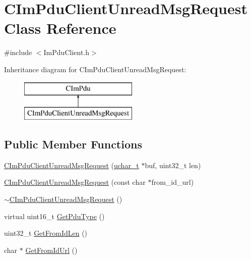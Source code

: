 \hypertarget{class_c_im_pdu_client_unread_msg_request}{}\section{C\+Im\+Pdu\+Client\+Unread\+Msg\+Request Class Reference}
\label{class_c_im_pdu_client_unread_msg_request}


{\ttfamily \#include $<$Im\+Pdu\+Client.\+h$>$}

Inheritance diagram for C\+Im\+Pdu\+Client\+Unread\+Msg\+Request\+:\begin{figure}[H]
\begin{center}
\leavevmode
\includegraphics[height=2.000000cm]{class_c_im_pdu_client_unread_msg_request}
\end{center}
\end{figure}
\subsection*{Public Member Functions}
\begin{DoxyCompactItemize}
\item 
\hyperlink{class_c_im_pdu_client_unread_msg_request_ada50023bd4a71908e100de0e77d8da3d}{C\+Im\+Pdu\+Client\+Unread\+Msg\+Request} (\hyperlink{base_2ostype_8h_a124ea0f8f4a23a0a286b5582137f0b8d}{uchar\+\_\+t} $\ast$buf, uint32\+\_\+t len)
\item 
\hyperlink{class_c_im_pdu_client_unread_msg_request_a3608dbde13ad05b8e8ec9cb27e24cf56}{C\+Im\+Pdu\+Client\+Unread\+Msg\+Request} (const char $\ast$from\+\_\+id\+\_\+url)
\item 
\hyperlink{class_c_im_pdu_client_unread_msg_request_a7bcf8d1ee4ce2ba02e9ab78562a8f323}{$\sim$\+C\+Im\+Pdu\+Client\+Unread\+Msg\+Request} ()
\item 
virtual uint16\+\_\+t \hyperlink{class_c_im_pdu_client_unread_msg_request_a7bc389d04c00cf9685aa4d015ba9221f}{Get\+Pdu\+Type} ()
\item 
uint32\+\_\+t \hyperlink{class_c_im_pdu_client_unread_msg_request_a82639beb7d0c2f38e6fccb927fc98cc0}{Get\+From\+Id\+Len} ()
\item 
char $\ast$ \hyperlink{class_c_im_pdu_client_unread_msg_request_a11baf29a90f6438b2f6361e6bb389174}{Get\+From\+Id\+Url} ()
\end{DoxyCompactItemize}
